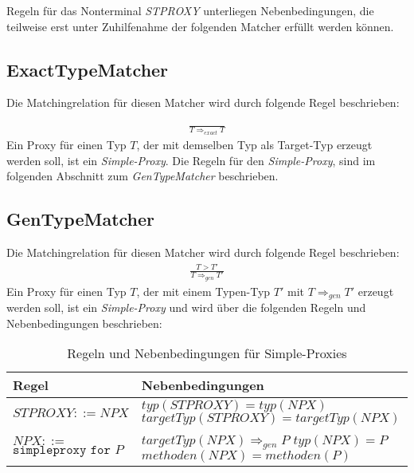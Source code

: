 \documentclass[a4paper,12pt]{article}
\begin{document}
\noindent
Regeln für das Nonterminal \emph{STPROXY} unterliegen Nebenbedingungen, die teilweise erst unter Zuhilfenahme der folgenden Matcher erfüllt werden können.
\subsection{ExactTypeMatcher}
Die Matchingrelation für diesen Matcher wird durch folgende Regel beschrieben:

\begin{gather*}
\frac{}{T \Rightarrow_{exact} T}
\end{gather*}
Ein Proxy für einen Typ $T$, der mit demselben Typ als Target-Typ erzeugt werden soll, ist ein \emph{Simple-Proxy}. Die Regeln für den \emph{Simple-Proxy}, sind im folgenden Abschnitt zum \emph{GenTypeMatcher} beschrieben.


\subsection{GenTypeMatcher}
Die Matchingrelation für diesen Matcher wird durch folgende Regel beschrieben:
\begin{gather*}
\frac{T > T'}{T \Rightarrow_{gen} T'}
\end{gather*}
Ein Proxy für einen Typ $T$, der mit einem Typen-Typ $T'$ mit $T \Rightarrow_{gen} T'$ erzeugt werden soll, ist ein \emph{Simple-Proxy} und wird über die folgenden Regeln und Nebenbedingungen beschrieben:

\begin{table}[H]
\centering
\begin{tabular}{|p{4cm}|p{10cm}|}
\hline
\hline
\centering\textbf{Regel} & \textbf{Nebenbedingungen} \\
\hline
\hline
$\mathit{STPROXY} ::= NPX$ &
$\mathit{typ(STPROXY)}=\mathit{typ(NPX)}$\newline
$\mathit{targetTyp(STPROXY)} = \mathit{targetTyp(NPX)}$\\
\hline
$\mathit{NPX} ::=$ \newline $\texttt{simpleproxy } \texttt{for } P$ & 
$\mathit{targetTyp(NPX)} \Rightarrow_{gen} P $\newline
$\mathit{typ(NPX)}=P$\newline
$\mathit{methoden(NPX)} = \mathit{methoden(P)}$
\\
\hline
\hline
\end{tabular}
\caption{Regeln und Nebenbedingungen für Simple-Proxies}
 \label{tab:simpAttr}
\end{table}
\end{document}
